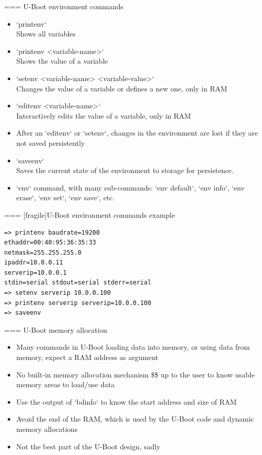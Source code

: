 === {U-Boot environment commands}
  \begin{itemize}
    \item `printenv`\\
      Shows all variables
    \item `printenv <variable-name>`\\
      Shows the value of a variable
    \item `setenv <variable-name> <variable-value>`\\
      Changes the value of a variable or defines a new one, only in RAM
    \item `editenv <variable-name>`\\
      Interactively edits the value of a variable, only in RAM
    \item After an `editenv` or `setenv`, changes in the
      environment are lost if they are not saved persistently
    \item `saveenv`\\
      Saves the current state of the environment to storage for persistence.
    \item `env` command, with many sub-commands: `env
        default`, `env info`, `env erase`, `env set`,
      `env save`, etc.
  \end{itemize}


=== [fragile]{U-Boot environment commands example}
  \begin{block}{}
\small
\begin{verbatim}
=> printenv baudrate=19200
ethaddr=00:40:95:36:35:33
netmask=255.255.255.0
ipaddr=10.0.0.11
serverip=10.0.0.1
stdin=serial stdout=serial stderr=serial
=> setenv serverip 10.0.0.100
=> printenv serverip serverip=10.0.0.100
=> saveenv
\end{verbatim}
\end{block}


=== {U-Boot memory allocation}
  \begin{itemize}
  \item Many commands in U-Boot loading data into memory, or using
    data from memory, expect a RAM address as argument
  \item No built-in memory allocation mechanism \$\rightarrow\$ up to
    the user to know usable memory areas to load/use data
  \item Use the output of `bdinfo` to know the start address and
    size of RAM
  \item Avoid the end of the RAM, which is used by the U-Boot code and
    dynamic memory allocations
  \item Not the best part of the U-Boot design, sadly
  \end{itemize}



